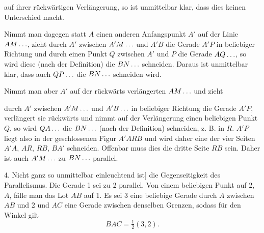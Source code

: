 auf ihrer rückwärtigen Verlängerung, so ist unmittelbar klar, dass dies keinen Unterschied macht.

Nimmt man dagegen statt $A$ einen anderen Anfangspunkt $A'$ auf der Linie $AM\mathinner{.\,.\,.}$, zieht durch $A'$ zwischen $A'M\mathinner{.\,.\,.}$ und $A'B$ die Gerade $A'P$ in beliebiger Richtung und durch einen Punkt $Q$ zwischen $A'$ und $P$ die Gerade $AQ\mathinner{.\,.\,.}$, so wird diese (nach der Definition) die $BN\mathinner{.\,.\,.}$ schneiden. Daraus ist unmittelbar klar, dass auch $QP\mathinner{.\,.\,.}$ die $BN\mathinner{.\,.\,.}$ schneiden wird.

\begin{center}

\end{center}

Nimmt man aber $A'$ auf der rückwärts verlängerten $AM\mathinner{.\,.\,.}$ und zieht

\begin{center}

\end{center}
\noindent durch $A'$ zwischen $A'M\mathinner{.\,.\,.}$ und $A'B\mathinner{.\,.\,.}$ in beliebiger Richtung die Gerade $A'P$, verlängert sie rückwärts und nimmt auf der Verlängerung einen beliebigen Punkt $Q$, so wird $QA\mathinner{.\,.\,.}$ die $BN\mathinner{.\,.\,.}$ (nach der Definition) schneiden, z. B. in $R$. $A'P$ liegt also in der geschlossenen Figur $A'ARB$ und wird daher eine der vier Seiten $A'A$, $AR$, $RB$, $BA'$ schneiden. Offenbar muss dies die dritte Seite $RB$ sein. Daher ist auch $A'M\mathinner{.\,.\,.}$ zu $BN\mathinner{.\,.\,.}$ parallel.

4. Nicht ganz so unmittelbar einleuchtend ist] die Gegenseitigkeit des Parallelismus. Die Gerade 1 sei zu 2 parallel. Von einem beliebigen Punkt auf 2, $A$, fälle man das Lot $AB$ auf 1. Es sei 3 eine beliebige Gerade durch $A$ zwischen $AB$ und 2 und $AC$ eine Gerade zwischen denselben Grenzen, sodass für den Winkel gilt
\[
BAC = \tfrac{1}{2}(3,2).
\]

